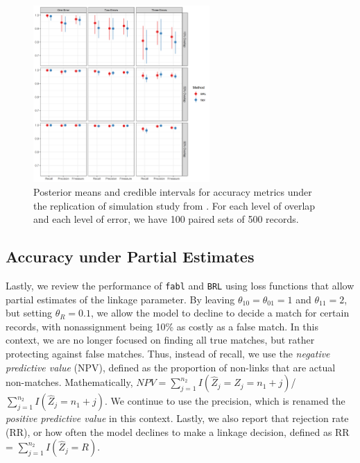 \documentclass[12pt,letterpaper]{article}
\newcommand{\1}[1]{\mathbb{I}\!\left[#1\right]} %
\begin{document}
\begin{figure}[h!]
\begin{center}
\includegraphics[width=0.6\textwidth]{../notes/figures/sadinle_sim_plot2} 
\caption{Posterior means and credible intervals for accuracy metrics under the replication of simulation study from \cite{sadinle_bayesian_2017}. For each level of overlap and each level of error, we have 100 paired sets of 500 records.}
\label{fig:sadinle_simulation}
\end{center}
\end{figure}

%
%	
%		
%	
%	

\hypertarget{partial}{%
	\subsection{Accuracy under Partial Estimates}\label{partial}}

Lastly, we review the performance of \texttt{fabl} and \texttt{BRL} using loss functions that allow partial estimates of the linkage parameter. By leaving $\theta_{10} = \theta_{01} = 1$ and $\theta_{11} = 2$, but setting $\theta_R = 0.1$, we allow the model to decline to decide a match for certain records, with nonassignment being 10\% as costly as a false match. In this context, we are no longer focused on finding all true matches, but rather protecting against false matches. Thus, instead of recall, we use the \emph{negative predictive value} (NPV), defined as the proportion of non-links that are actual non-matches. Mathematically, $NPV = \sum_{j=1}^{n_2} I(\hat{Z}_j = Z_j = n_1 + j)$/$\sum_{j=1}^{n_2} I(\hat{Z}_j = n_1 + j)$. We continue to use the precision, which is renamed the \emph{positive predictive value} in this context. Lastly, we also report that rejection rate (RR), or how often the model declines to make a linkage decision, defined as RR = $\sum_{j=1}^{n_2} I(\hat{Z}_j = R)$.
\end{document}
